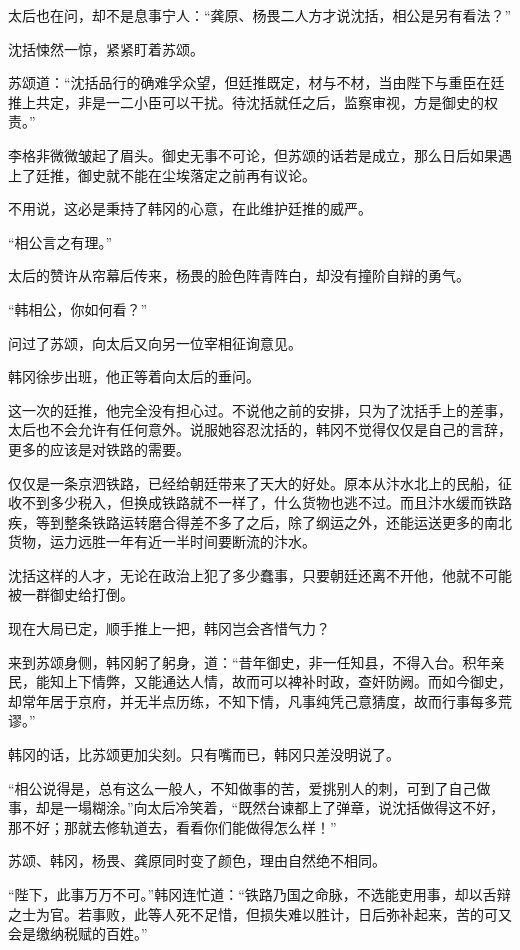 太后也在问，却不是息事宁人：“龚原、杨畏二人方才说沈括，相公是另有看法？”

沈括悚然一惊，紧紧盯着苏颂。

苏颂道：“沈括品行的确难孚众望，但廷推既定，材与不材，当由陛下与重臣在廷推上共定，非是一二小臣可以干扰。待沈括就任之后，监察审视，方是御史的权责。”

李格非微微皱起了眉头。御史无事不可论，但苏颂的话若是成立，那么日后如果遇上了廷推，御史就不能在尘埃落定之前再有议论。

不用说，这必是秉持了韩冈的心意，在此维护廷推的威严。

“相公言之有理。”

太后的赞许从帘幕后传来，杨畏的脸色阵青阵白，却没有撞阶自辩的勇气。

“韩相公，你如何看？”

问过了苏颂，向太后又向另一位宰相征询意见。

韩冈徐步出班，他正等着向太后的垂问。

这一次的廷推，他完全没有担心过。不说他之前的安排，只为了沈括手上的差事，太后也不会允许有任何意外。说服她容忍沈括的，韩冈不觉得仅仅是自己的言辞，更多的应该是对铁路的需要。

仅仅是一条京泗铁路，已经给朝廷带来了天大的好处。原本从汴水北上的民船，征收不到多少税入，但换成铁路就不一样了，什么货物也逃不过。而且汴水缓而铁路疾，等到整条铁路运转磨合得差不多了之后，除了纲运之外，还能运送更多的南北货物，运力远胜一年有近一半时间要断流的汴水。

沈括这样的人才，无论在政治上犯了多少蠢事，只要朝廷还离不开他，他就不可能被一群御史给打倒。

现在大局已定，顺手推上一把，韩冈岂会吝惜气力？

来到苏颂身侧，韩冈躬了躬身，道：“昔年御史，非一任知县，不得入台。积年亲民，能知上下情弊，又能通达人情，故而可以裨补时政，查奸防阙。而如今御史，却常年居于京府，并无半点历练，不知下情，凡事纯凭己意猜度，故而行事每多荒谬。”

韩冈的话，比苏颂更加尖刻。只有嘴而已，韩冈只差没明说了。

“相公说得是，总有这么一般人，不知做事的苦，爱挑别人的刺，可到了自己做事，却是一塌糊涂。”向太后冷笑着，“既然台谏都上了弹章，说沈括做得这不好，那不好；那就去修轨道去，看看你们能做得怎么样！”

苏颂、韩冈，杨畏、龚原同时变了颜色，理由自然绝不相同。

“陛下，此事万万不可。”韩冈连忙道：“铁路乃国之命脉，不选能吏用事，却以舌辩之士为官。若事败，此等人死不足惜，但损失难以胜计，日后弥补起来，苦的可又会是缴纳税赋的百姓。”

